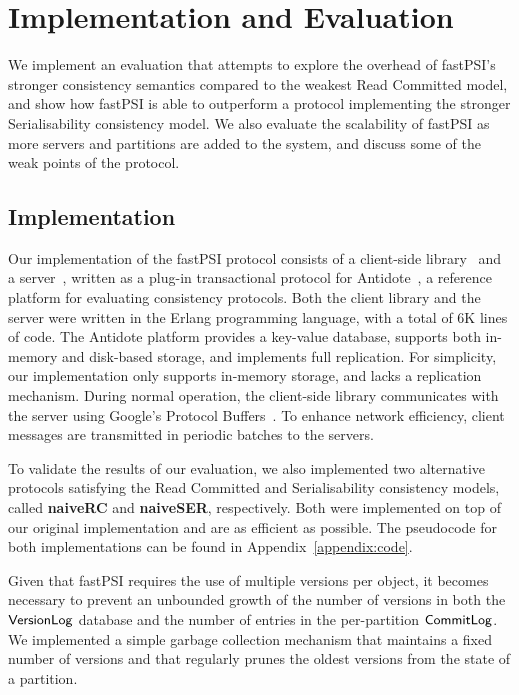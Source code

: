 \cleardoublepage
\chapter{Implementation and Evaluation}
\label{chapter:evaluation}

We implement an evaluation that attempts to explore the overhead of fastPSI's stronger consistency semantics compared to the weakest Read Committed model, and show how fastPSI is able to outperform a protocol implementing the stronger Serialisability consistency model. We also evaluate the scalability of fastPSI as more servers and partitions are added to the system, and discuss some of the weak points of the protocol.

\section{Implementation}

Our implementation of the fastPSI protocol consists of a client-side library~\citep{pvc-client} and a server~\citep{pvc-server}, written as a plug-in transactional protocol for Antidote~\citep{antidote-db}, a reference platform for evaluating consistency protocols. Both the client library and the server were written in the Erlang programming language, with a total of 6K lines of code. The Antidote platform provides a key-value database, supports both in-memory and disk-based storage, and implements full replication. For simplicity, our implementation only supports in-memory storage, and lacks a replication mechanism. During normal operation, the client-side library communicates with the server using Google's Protocol Buffers~\citep{protobuf}. To enhance network efficiency, client messages are transmitted in periodic batches to the servers.

To validate the results of our evaluation, we also implemented two alternative protocols satisfying the Read Committed and Serialisability consistency models, called \textbf{naiveRC} and \textbf{naiveSER}, respectively. Both were implemented on top of our original implementation and are as efficient as possible. The pseudocode for both implementations can be found in Appendix~\ref{appendix:code}.

Given that fastPSI requires the use of multiple versions per object, it becomes necessary to prevent an unbounded growth of the number of versions in both the $\mathsf{VersionLog}$ database and the number of entries in the per-partition $\mathsf{CommitLog}$. We implemented a simple garbage collection mechanism that maintains a fixed number of versions and that regularly prunes the oldest versions from the state of a partition.

